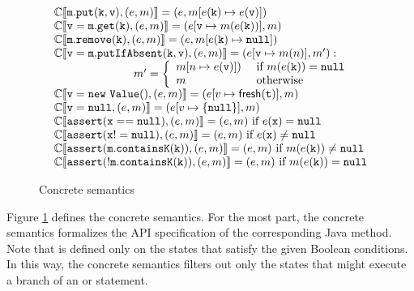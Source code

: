 \begin{figure}
	\[
	\begin{array}{l}
	\mathbb{C}\llbracket \mathtt{m.put(k, v)}, (e, m) \rrbracket = 
	(e, m[e(\mathtt{k}) \mapsto e(\mathtt{v})])\\
	\mathbb{C}\llbracket \mathtt{v=m.get(k)}, (e, m) \rrbracket = (e[\mathtt{v} \mapsto m(e(\mathtt{k}))], m) \\
	\mathbb{C}\llbracket \mathtt{m.remove(k)}, (e, m) \rrbracket = 
	(e, m[e(\mathtt{k}) \mapsto \mathtt{null}])\\
	\mathbb{C}\llbracket \mathtt{v = m.putIfAbsent(k, v)}, (e, m) \rrbracket =  (e[\mathtt{v} \mapsto m(n)], m') : \\
	\hspace{70pt} 
	m'=
	\left\{
	\begin{array}{ll}
	m[n \mapsto e(\mathtt{v})]) & \textrm{ if } m(e(\mathtt{k})) = \mathtt{null}\\
	m & \textrm{ otherwise}\\
	\end{array}
	\right. \\
	\mathbb{C}\llbracket \mathtt{v = new\ Value()}, (e, m) \rrbracket =  (e[v \mapsto \mathsf{fresh}(\mathtt{t})], m)\\
	\mathbb{C}\llbracket \mathtt{v = null}, (e, m) \rrbracket =  (e[v \mapsto \{\mathtt{null}\}], m)\\
	\mathbb{C}\llbracket \mathtt{assert(x==null)}, (e, m) \rrbracket = (e,m) \textrm{ if } e(\mathtt{x})=\mathtt{null}\\
	\mathbb{C}\llbracket \mathtt{assert(x!=null)}, (e, m) \rrbracket = (e,m ) \textrm{ if } e(\mathtt{x})\neq\mathtt{null}\\
	\mathbb{C}\llbracket \mathtt{assert(m.containsK(k))}, (e, m) \rrbracket = (e, m) \textrm{ if } m(e(\mathtt{k})) \neq \mathtt{null}\\
	\mathbb{C}\llbracket \mathtt{assert(!m.containsK(k))}, (e, m) \rrbracket =(e, m) \textrm{ if } m(e(\mathtt{k})) = \mathtt{null}\\
	\end{array}
	\]
	\caption{Concrete semantics}
	\label{fig:concretesemantics}
\end{figure}


Figure \ref{fig:concretesemantics} defines the concrete semantics. For the most part, the concrete semantics formalizes the API specification of the corresponding Java method. Note that  is defined only on the states that satisfy the given Boolean conditions. In this way, the concrete semantics filters out only the states that might execute a branch of an  or  statement.

